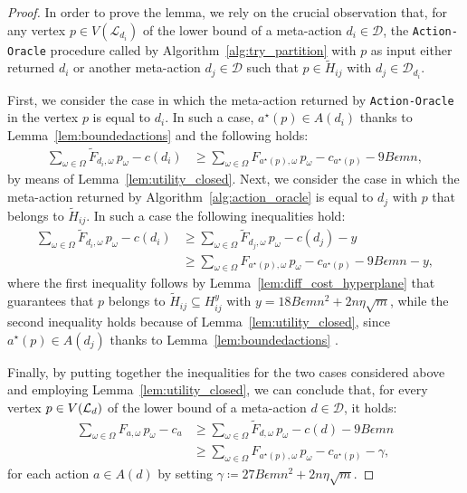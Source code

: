\epsilonbregions*
\begin{proof}
	In order to prove the lemma, we rely on the crucial observation that, for any vertex $p \in V(\mathcal{L}_{d_i})$ of the lower bound of a meta-action $d_i \in \mathcal{D}$, the \texttt{Action-Oracle} procedure called by Algorithm~\ref{alg:try_partition} with $p$ as input either returned $d_i$ or another meta-action $d_j \in \mathcal{D}$ such that $p \in \widetilde{H}_{ij}$ with $d_j \in \mathcal{D}_{d_i}$. 
	
	First, we consider the case in which the meta-action returned by \texttt{Action-Oracle} in the vertex $p$ is equal to $d_i$.
	In such a case, $a^\star(p) \in A(d_i)$ thanks to Lemma~\ref{lem:boundedactions} and the following holds:
	\begin{align*}
		\sum_{\omega \in \Omega} \widetilde{F}_{d_i,\omega} \, p_{\omega} - {c}({d_i}) & \ge \sum_{\omega \in \Omega} {F}_{a^\star(p) ,\omega} \, p_{\omega} - {c}_{a^\star(p) }  - 9 B \epsilon m n,
	\end{align*}
	by means of Lemma~\ref{lem:utility_closed}. Next, we consider the case in which the meta-action returned by Algorithm~\ref{alg:action_oracle} is equal to $d_j$ with $p $ that belongs to $\widetilde{H}_{ij}$. In such a case the following inequalities hold:
	\begin{align*}
	\sum_{\omega \in \Omega} \widetilde{F}_{d_i,\omega} \, p_{\omega} - {c}(d_i) & \ge \sum_{\omega \in \Omega} \widetilde{F}_{d_j,\omega} \, p_{\omega} - {c}(d_j) - y \nonumber \\
	& \ge \sum_{\omega \in \Omega} {F}_{a^\star(p),\omega} \, p_{\omega} - {c}_{a^\star(p)}  - 9 B \epsilon m n \nonumber - y,
	\end{align*}
	where the first inequality follows by Lemma~\ref{lem:diff_cost_hyperplane} that guarantees that $p$ belongs to $ \widetilde{H}_{ij} \subseteq H^y_{ij}$ with $y=18 B \epsilon m n^2 + 2  n \eta \sqrt{m}$, while the second inequality holds because of Lemma~\ref{lem:utility_closed}, since $a^\star(p) \in A(d_j)$ thanks to Lemma~\ref{lem:boundedactions} .
	
 	Finally, by putting together the inequalities for the two cases considered above and employing Lemma~\ref{lem:utility_closed}, we can conclude that, for every vertex $p \in V(\mathcal{L}_{d})$ of the lower bound of a meta-action $d \in \mathcal{D}$, it holds:
 		\begin{align}
 			\sum_{\omega \in \Omega} {F}_{a,\omega} \, p_{\omega} - {c}_{a}
 			& \ge \sum_{\omega \in \Omega} \widetilde{F}_{d,\omega} \, p_{\omega} - {c}(d) - 9 B \epsilon m n   \nonumber   \\
 			& \ge \sum_{\omega \in \Omega} {F}_{a^\star(p),\omega} \, p_{\omega} - {c}_{a^\star(p)}  - \gamma,\label{eq:gamma_br}
 	 \end{align}
 	for each action $a \in A(d)$ by setting $\gamma \coloneqq 27 B \epsilon m n^2 + 2  n \eta \sqrt{m}$.
 	

\end{proof}
